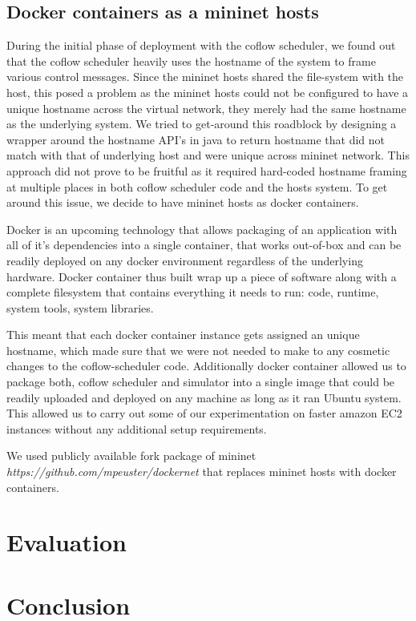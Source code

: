 \documentclass[conference]{IEEEtran}
\begin{document}
\subsection{Docker containers as a mininet hosts}
During the initial phase of deployment with the coflow scheduler, we found out that the coflow scheduler heavily uses the hostname of the system to frame various control messages. Since the mininet hosts shared the file-system with the host, this posed a problem as the mininet hosts could not be configured to have a unique hostname across the virtual network, they merely had the same hostname as the underlying system. We tried to get-around this roadblock by designing a wrapper around the hostname API’s in java to return hostname that did not match with that of underlying host and were unique across mininet network. This approach did not prove to be fruitful as it required hard-coded hostname framing  at multiple places in both coflow scheduler code and the hosts system.  To get around this issue, we decide to have mininet hosts as docker containers.

Docker is an upcoming technology that allows packaging of an application with all of it’s dependencies into a single container, that works out-of-box and can be readily deployed on any docker environment regardless of the underlying hardware. Docker container thus built wrap up a piece of software along with a complete filesystem that contains everything it needs to run: code, runtime, system tools, system libraries. 

This meant that each docker container instance gets assigned an unique hostname, which made sure that we were not needed to make to any cosmetic changes to the coflow-scheduler code. Additionally  docker container allowed us to package both, coflow scheduler and simulator into a single image that could be readily uploaded and deployed on any machine as long as it ran Ubuntu system. This allowed us to carry out some of our experimentation on faster amazon EC2 instances without any additional setup requirements.

We used publicly available fork package of mininet \textit{https://github.com/mpeuster/dockernet} that replaces mininet hosts with docker containers.


\section{Evaluation}

\section{Conclusion}
\end{document}
